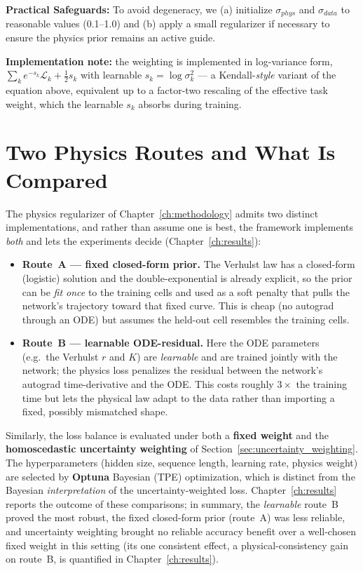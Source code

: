 \textbf{Practical Safeguards:} To avoid degeneracy, we (a) initialize $\sigma_{phys}$ and $\sigma_{data}$ to reasonable values (0.1--1.0) and (b) apply a small regularizer if necessary to ensure the physics prior remains an active guide.

\textbf{Implementation note:} the weighting is implemented in log-variance form, $\sum_k e^{-s_k}\mathcal{L}_k + \tfrac{1}{2}s_k$ with learnable $s_k = \log\sigma_k^2$ --- a Kendall-\emph{style} variant of the equation above, equivalent up to a factor-two rescaling of the effective task weight, which the learnable $s_k$ absorbs during training.

\section{Two Physics Routes and What Is Compared}
\label{sec:two_routes}

The physics regularizer of Chapter~\ref{ch:methodology} admits two distinct
implementations, and rather than assume one is best, the framework implements
\emph{both} and lets the experiments decide (Chapter~\ref{ch:results}):

\begin{itemize}
    \item \textbf{Route~A --- fixed closed-form prior.} The Verhulst law has a
    closed-form (logistic) solution and the double-exponential is already explicit,
    so the prior can be \emph{fit once} to the training cells and used as a soft
    penalty that pulls the network's trajectory toward that fixed curve. This is
    cheap (no autograd through an ODE) but assumes the held-out cell resembles the
    training cells.
    \item \textbf{Route~B --- learnable ODE-residual.} Here the ODE parameters
    (e.g.\ the Verhulst $r$ and $K$) are \emph{learnable} and are trained jointly
    with the network; the physics loss penalizes the residual between the network's
    autograd time-derivative and the ODE. This costs roughly $3\times$ the training
    time but lets the physical law adapt to the data rather than importing a fixed,
    possibly mismatched shape.
\end{itemize}

Similarly, the loss balance is evaluated under both a \textbf{fixed weight} and the
\textbf{homoscedastic uncertainty weighting} of Section~\ref{sec:uncertainty_weighting}. The hyperparameters
(hidden size, sequence length, learning rate, physics weight) are selected by
\textbf{Optuna} Bayesian (TPE) optimization, which is distinct from the Bayesian
\emph{interpretation} of the uncertainty-weighted loss. Chapter~\ref{ch:results}
reports the outcome of these comparisons; in summary, the \emph{learnable} route~B
proved the most robust, the fixed closed-form prior (route~A) was less reliable,
and uncertainty weighting brought no reliable accuracy benefit over a well-chosen
fixed weight in this setting (its one consistent effect, a physical-consistency
gain on route~B, is quantified in Chapter~\ref{ch:results}).